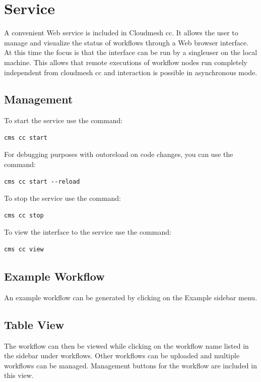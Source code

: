 \section{Service}\label{service}

A convenient Web service is included in Cloudmesh cc. It allows the user
to manage and visualize the status of workflows through a Web browser
interface. At this time the focus is that the interface can be run by a
singleuser on the local machine. This allows that remote executions of
workflow nodes run completely independent from cloudmesh cc and
interaction is possible in asynchronous mode.

\subsection{Management}\label{management}

To start the service use the command:

\begin{verbatim}
cms cc start
\end{verbatim}

For debugging purposes with outoreload on code changes, you can use the
command:

\begin{verbatim}
cms cc start --reload
\end{verbatim}

To stop the service use the command:

\begin{verbatim}
cms cc stop
\end{verbatim}

To view the interface to the service use the command:

\begin{verbatim}
cms cc view
\end{verbatim}

\subsection{Example Workflow}\label{example-workflow}

An example workflow can be generated by clicking on the Example
sidebar menu.

\subsection{Table View}\label{table-view}

The workflow can then be viewed while clicking on the workflow name
listed in the sidebar under workflows. Other workflows can be uploaded
and multiple workflows can be managed. Management buttons for the
workflow are included in this view.

